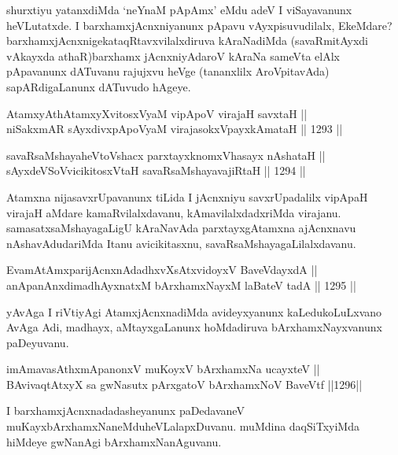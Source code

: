 \begin{artha}
shurxtiyu yatanxdiMda `neYnaM pApAmx' eMdu adeV I viSayavanunx heVLutatxde. I barxhamxjAcnxniyanunx pApavu vAyxpisuvudilalx, EkeMdare? barxhamxjAcnxnigekataqRtavxvilalxdiruva kAraNadiMda (savaRmitAyxdi vAkayxda athaR)barxhamx jAcnxniyAdaroV kAraNa sameVta elAlx pApavanunx dATuvanu rajujxvu heVge (tananxlilx AroVpitavAda) sapARdigaLanunx dATuvudo hAgeye.
\end{artha}

\begin{shl}
AtamxyAthAtamxyXvitosxV\s yaM vipApoV virajaH savxtaH || \\
niSakxmAR sAyxdivxpApoV\s yaM virajasokxV\s payxkAmataH \hfill || 1293 ||  
\end{shl}

\begin{shl}
savaRsaMshayaheVtoVshacx parxtayxknomxVhasayx nAshataH || \\
sAyxdeVSoV\s vicikitosxV\s taH savaRsaMshayavajiRtaH \hfill || 1294 ||  
\end{shl}

\begin{artha}
Atamxna nijasavxrUpavanunx tiLida I jAcnxniyu savxrUpadalilx vipApaH virajaH aMdare kamaRvilalxdavanu, kAmavilalxdadxriMda virajanu. samasatxsaMshayagaLigU kAraNavAda parxtayxgAtamxna ajAcnxnavu nAshavAdudariMda Itanu avicikitasxnu, savaRsaMshayagaLilalxdavanu.
\end{artha}


\begin{shl}
EvamAtAmxparijAcnxnAdadhxvXsAtxvidoyxV BaveVdayxdA || \\
anApanAnxdimadhAyxnatxM bArxhamxNayxM laBateV tadA \hfill || 1295 ||  
\end{shl}

\begin{artha}
yAvAga I riVtiyAgi AtamxjAcnxnadiMda avideyxyanunx kaLedukoLuLxvano AvAga Adi, madhayx, aMtayxgaLanunx hoMdadiruva bArxhamxNayxvanunx paDeyuvanu.
\end{artha}

\begin{shl}
imAmavasAthxmApanonxV muKoyxV bArxhamxNa ucayxteV || \\
BAvivaqtAtxyX sa gwNasutx pArxgatoV bArxhamxNoV BaveVtf \hfill ||1296||  
\end{shl}

\begin{artha}
I barxhamxjAcnxnadadasheyanunx paDedavaneV muKayxbArxhamxNaneMdu\break heVLalapxDuvanu. muMdina daqSiTxyiMda hiMdeye gwNanAgi bArxhamxNanAguvanu.
\end{artha}

